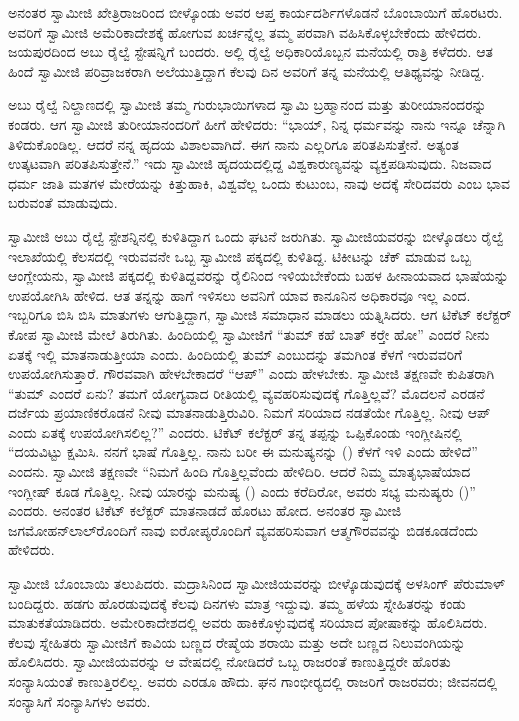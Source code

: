  ಅನಂತರ ಸ್ವಾಮೀಜಿ ಖೇತ್ರಿರಾಜರಿಂದ ಬೀಳ್ಕೊಂಡು ಅವರ ಆಪ್ತ ಕಾರ್ಯದರ್ಶಿಗಳೊಡನೆ ಬೊಂಬಾಯಿಗೆ ಹೊರಟರು. ಅವರಿಗೆ ಸ್ವಾಮೀಜಿ ಅಮೆರಿಕಾದೇಶಕ್ಕೆ ಹೋಗುವ ಖರ್ಚನ್ನೆಲ್ಲ ತಮ್ಮ ಪರವಾಗಿ ವಹಿಸಿಕೊಳ್ಳಬೇಕೆಂದು ಹೇಳಿದರು. ಜಯಪುರದಿಂದ ಅಬು ರೈಲ್ವೆ ಸ್ಟೇಷನ್ನಿಗೆ ಬಂದರು. ಅಲ್ಲಿ ರೈಲ್ವೆ ಅಧಿಕಾರಿಯೊಬ್ಬನ ಮನೆಯಲ್ಲಿ ರಾತ್ರಿ ಕಳೆದರು. ಆತ ಹಿಂದೆ ಸ್ವಾಮೀಜಿ ಪರಿವ್ರಾಜಕರಾಗಿ ಅಲೆಯುತ್ತಿದ್ದಾಗ ಕೆಲವು ದಿನ ಅವರಿಗೆ ತನ್ನ ಮನೆಯಲ್ಲಿ ಆತಿಥ್ಯವನ್ನು ನೀಡಿದ್ದ. 

ಅಬು ರೈಲ್ವೆ ನಿಲ್ದಾಣದಲ್ಲಿ ಸ್ವಾಮೀಜಿ ತಮ್ಮ ಗುರುಭಾಯಿಗಳಾದ ಸ್ವಾಮಿ ಬ್ರಹ್ಮಾನಂದ ಮತ್ತು ತುರೀಯಾನಂದರನ್ನು ಕಂಡರು. ಆಗ ಸ್ವಾಮೀಜಿ ತುರೀಯಾನಂದರಿಗೆ ಹೀಗೆ ಹೇಳಿದರು: “ಭಾಯ್, ನಿನ್ನ ಧರ್ಮವನ್ನು ನಾನು ಇನ್ನೂ ಚೆನ್ನಾಗಿ ತಿಳಿದುಕೊಂಡಿಲ್ಲ. ಆದರೆ ನನ್ನ ಹೃದಯ ವಿಶಾಲವಾಗಿದೆ. ಈಗ ನಾನು ಎಲ್ಲರಿಗೂ ಪರಿತಪಿಸುತ್ತೇನೆ. ಅತ್ಯಂತ ಉತ್ಕಟವಾಗಿ ಪರಿತಪಿಸುತ್ತೇನೆ.” ಇದು ಸ್ವಾಮೀಜಿ ಹೃದಯದಲ್ಲಿದ್ದ ವಿಶ್ವಕಾರುಣ್ಯವನ್ನು ವ್ಯಕ್ತಪಡಿಸುವುದು. ನಿಜವಾದ ಧರ್ಮ ಜಾತಿ ಮತಗಳ ಮೇರೆಯನ್ನು ಕಿತ್ತುಹಾಕಿ, ವಿಶ್ವವೆಲ್ಲ ಒಂದು ಕುಟುಂಬ, ನಾವು ಅದಕ್ಕೆ ಸೇರಿದವರು ಎಂಬ ಭಾವ ಬರುವಂತೆ ಮಾಡುವುದು. 

 ಸ್ವಾಮೀಜಿ ಅಬು ರೈಲ್ವೆ ಸ್ಟೇಶನ್ನಿನಲ್ಲಿ ಕುಳಿತಿದ್ದಾಗ ಒಂದು ಘಟನೆ ಜರುಗಿತು. ಸ್ವಾಮೀಜಿಯವರನ್ನು ಬೀಳ್ಕೊಡಲು ರೈಲ್ವೆ ಇಲಾಖೆಯಲ್ಲಿ ಕೆಲಸದಲ್ಲಿ ಇರುವವನೇ ಒಬ್ಬ ಸ್ವಾಮೀಜಿ ಪಕ್ಕದಲ್ಲಿ ಕುಳಿತಿದ್ದ. ಟಿಕೀಟನ್ನು ಚೆಕ್ ಮಾಡುವ ಒಬ್ಬ ಆಂಗ್ಲೇಯನು, ಸ್ವಾಮೀಜಿ ಪಕ್ಕದಲ್ಲಿ ಕುಳಿತಿದ್ದವರನ್ನು ರೈಲಿನಿಂದ ಇಳಿಯಬೇಕೆಂದು ಬಹಳ ಹೀನಾಯವಾದ ಭಾಷೆಯನ್ನು ಉಪಯೋಗಿಸಿ ಹೇಳಿದ. ಆತ ತನ್ನನ್ನು ಹಾಗೆ ಇಳಿಸಲು ಅವನಿಗೆ ಯಾವ ಕಾನೂನಿನ ಅಧಿಕಾರವೂ ಇಲ್ಲ ಎಂದ. ಇಬ್ಬರಿಗೂ ಬಿಸಿ ಬಿಸಿ ಮಾತುಗಳು ಆಗುತ್ತಿದ್ದಾಗ, ಸ್ವಾಮೀಜಿ ಸಮಾಧಾನ ಮಾಡಲು ಯತ್ನಿಸಿದರು. ಆಗ ಟಿಕೆಟ್ ಕಲೆಕ್ಟರ್ ಕೋಪ ಸ್ವಾಮೀಜಿ ಮೇಲೆ ತಿರುಗಿತು. ಹಿಂದಿಯಲ್ಲಿ ಸ್ವಾಮೀಜಿಗೆ “ತುಮ್ ಕಹೆ ಬಾತ್ ಕರ್‍ತೇ‌ ಹೋ” ಎಂದರೆ ನೀನು ಏತಕ್ಕೆ ಇಲ್ಲಿ ಮಾತನಾಡುತ್ತೀಯಾ ಎಂದು. ಹಿಂದಿಯಲ್ಲಿ ತುಮ್ ಎಂಬುದನ್ನು ತಮಗಿಂತ ಕೆಳಗೆ ಇರುವವರಿಗೆ ಉಪಯೋಗಿಸುತ್ತಾರೆ. ಗೌರವವಾಗಿ ಹೇಳಬೇಕಾದರೆ “ಆಪ್” ಎಂದು ಹೇಳಬೇಕು. ಸ್ವಾಮೀಜಿ ತಕ್ಷಣವೇ ಕುಪಿತರಾಗಿ “ತುಮ್ ಎಂದರೆ ಏನು? ತಮಗೆ ಯೋಗ್ಯವಾದ ರೀತಿಯಲ್ಲಿ ವ್ಯವಹರಿಸುವುದಕ್ಕೆ ಗೊತ್ತಿಲ್ಲವೆ? ಮೊದಲನೆ ಎರಡನೆ ದರ್ಜೆಯ ಪ್ರಯಾಣಿಕರೊಡನೆ ನೀವು ಮಾತನಾಡುತ್ತಿರುವಿರಿ. ನಿಮಗೆ ಸರಿಯಾದ ನಡತೆಯೇ ಗೊತ್ತಿಲ್ಲ. ನೀವು ಆಪ್ ಎಂದು ಏತಕ್ಕೆ ಉಪಯೋಗಿಸಲಿಲ್ಲ?” ಎಂದರು. ಟಿಕೆಟ್ ಕಲೆಕ್ಟರ್ ತನ್ನ ತಪ್ಪನ್ನು ಒಪ್ಪಿಕೊಂಡು ಇಂಗ್ಲೀಷಿನಲ್ಲಿ “ದಯವಿಟ್ಟು ಕ್ಷಮಿಸಿ. ನನಗೆ ಭಾಷೆ ಗೊತ್ತಿಲ್ಲ. ನಾನು ಬರೀ ಈ ಮನುಷ್ಯನನ್ನು () ಕೆಳಗೆ ಇಳಿ ಎಂದು ಹೇಳಿದೆ” ಎಂದನು. ಸ್ವಾಮೀಜಿ ತಕ್ಷಣವೇ‌ “ನಿಮಗೆ ಹಿಂದಿ ಗೊತ್ತಿಲ್ಲವೆಂದು ಹೇಳಿದಿರಿ. ಆದರೆ ನಿಮ್ಮ ಮಾತೃಭಾಷೆಯಾದ ಇಂಗ್ಲೀಷ್ ಕೂಡ ಗೊತ್ತಿಲ್ಲ. ನೀವು ಯಾರನ್ನು ಮನುಷ್ಯ () ಎಂದು ಕರೆದಿರೋ, ಅವರು ಸಭ್ಯ ಮನುಷ್ಯರು ()” ಎಂದರು. ಅನಂತರ ಟಿಕೆಟ್ ಕಲೆಕ್ಟರ್ ಮಾತನಾಡದೆ ಹೊರಟು ಹೋದ. ಅನಂತರ ಸ್ವಾಮೀಜಿ ಜಗಮೋಹನ್‍ಲಾಲ್‍ರೊಂದಿಗೆ ನಾವು ಐರೋಪ್ಯರೊಂದಿಗೆ ವ್ಯವಹರಿಸುವಾಗ ಆತ್ಮಗೌರವವನ್ನು ಬಿಡಕೂಡದೆಂದು ಹೇಳಿದರು. 

 ಸ್ವಾಮೀಜಿ ಬೊಂಬಾಯಿ ತಲುಪಿದರು. ಮದ್ರಾಸಿನಿಂದ ಸ್ವಾಮೀಜಿಯವರನ್ನು ಬೀಳ್ಕೊಡುವುದಕ್ಕೆ ಅಳಸಿಂಗ್ ಪೆರುಮಾಳ್ ಬಂದಿದ್ದರು. ಹಡಗು ಹೊರಡುವುದಕ್ಕೆ ಕೆಲವು ದಿನಗಳು ಮಾತ್ರ ಇದ್ದುವು. ತಮ್ಮ ಹಳೆಯ ಸ್ನೇಹಿತರನ್ನು ಕಂಡು ಮಾತುಕತೆಯಾಡಿದರು. ಅಮೇರಿಕಾದೇಶದಲ್ಲಿ ಅವರು ಹಾಕಿಕೊಳ್ಳುವುದಕ್ಕೆ ಸರಿಯಾದ ಪೋಷಾಕನ್ನು ಹೊಲಿಸಿದರು. ಕೆಲವು ಸ್ನೇಹಿತರು ಸ್ವಾಮೀಜಿಗೆ ಕಾವಿಯ ಬಣ್ಣದ ರೇಷ್ಮೆಯ ಶರಾಯಿ ಮತ್ತು ಅದೇ ಬಣ್ಣದ ನಿಲುವಂಗಿಯನ್ನು ಹೊಲಿಸಿದರು. ಸ್ವಾಮೀಜಿಯವರನ್ನು ಆ ವೇಷದಲ್ಲಿ ನೋಡಿದರೆ ಒಬ್ಬ ರಾಜರಂತೆ ಕಾಣುತ್ತಿದ್ದರೇ ಹೊರತು ಸಂನ್ಯಾಸಿಯಂತೆ ಕಾಣುತ್ತಿರಲಿಲ್ಲ. ಅವರು ಎರಡೂ ಹೌದು. ಘನ ಗಾಂಭೀರ‍್ಯದಲ್ಲಿ ರಾಜರಿಗೆ ರಾಜರವರು; ಜೀವನದಲ್ಲಿ ಸಂನ್ಯಾಸಿಗೆ ಸಂನ್ಯಾಸಿಗಳು ಅವರು. 

